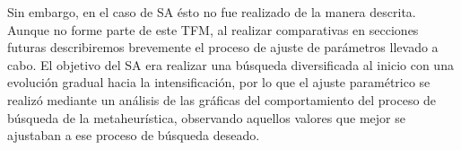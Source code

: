 Sin embargo, en el caso de SA ésto no fue realizado de la manera descrita. Aunque no forme parte de este TFM, al realizar comparativas en secciones futuras describiremos brevemente el proceso de ajuste de parámetros llevado a cabo.
El objetivo del SA era realizar una búsqueda diversificada al inicio con una evolución gradual hacia la intensificación, por lo que el ajuste paramétrico se realizó mediante un análisis de las gráficas del comportamiento del proceso de búsqueda de la metaheurística, observando aquellos valores que mejor se ajustaban a ese proceso de búsqueda deseado.


